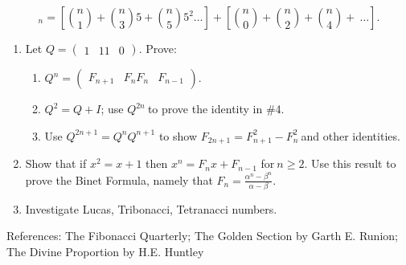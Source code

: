 \documentclass[10pt,letter]{article}
\begin{document}
\[
_{n} = \left\lbrack \binom{n}{1}  + \binom{n}{3} 5 + \binom{n}{5} 5^{2}\ldots \right\rbrack + \left\lbrack \binom{n}{0}  + \binom{n}{2}  + \binom{n}{4}  + \ \ldots \right\rbrack.
\]
\begin{enumerate}
\def\labelenumi{\arabic{enumi}.}

\item
  Let \(Q =
\begin{pmatrix}
  1 & 1
  1 & 0
  \end{pmatrix}
\). Prove:
\begin{enumerate}
  \def\labelenumii{\alph{enumii}.}

  \item
    \(Q^{n} =
\begin{pmatrix}
    F_{n + 1} & F_{n}
    F_{n} & F_{n - 1}
    \end{pmatrix}
\).
  \item
    \(Q^{2} = Q + I\); use \(Q^{2n}\ \)to prove the identity in \#4.
  \item
    Use \(Q^{2n + 1} = Q^{n}Q^{n + 1}\) to show
    \(F_{2n + 1} = F_{n + 1}^{2} - F_{n}^{2}\ \)and other identities.

\end{enumerate}
\item
  Show that if \(x^{2} = x + 1\) then \(x^{n} = F_{n}x + F_{n - 1}\)
  for\(\ n \geq 2\). Use this result to prove the Binet Formula, namely
  that \(F_{n} = \frac{\alpha^{n} - \beta^{n}}{\alpha - \beta}\).
\item
  Investigate Lucas, Tribonacci, Tetranacci numbers.

\end{enumerate}

References: The Fibonacci Quarterly; The Golden Section by Garth E.
Runion; The Divine Proportion by H.E. Huntley
\end{document}
